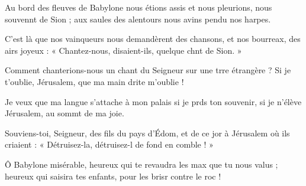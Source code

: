 \item Au bord des fleuves de Babylone nous étions assis et nous pleurions,\pscross{} nous souvennt de Sion ;\psstar{} aux saules des alentours nous avins pendu nos harpes.
\item C’est là que nos vainqueurs nous demandèrent des chansons,\pscross{} et nos bourreax, des airs joyeux :\psstar{} « Chantez-nous, disaient-ils, quelque chnt de Sion. »
\item Comment chanterions-nous un chant du Seigneur\pscross{} sur une trre étrangère ?\psstar{} Si je t’oublie, Jérusalem, que ma main drite m’oublie !
\item Je veux que ma langue s’attache à mon palais\pscross{} si je prds ton souvenir,\psstar{} si je n’élève Jérusalem, au sommt de ma joie.
\item Souviens-toi, Seigneur, des fils du pays d’Édom,\pscross{} et de ce jor à Jérusalem\psstar{} où ils criaient : « Détruisez-la, détruisez-l de fond en comble ! »
\item Ô Babylone misérable,\pscross{} heureux qui te revaudra les max que tu nous valus ;\psstar{} heureux qui saisira tes enfants, pour les brisr contre le roc !